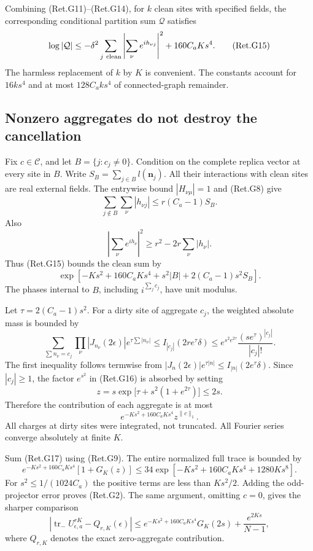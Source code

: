 Combining (Ret.G11)--(Ret.G14), for \(k\) clean sites with specified fields,
the corresponding conditional partition sum \(\mathcal Q\) satisfies
\[
 \log|\mathcal Q|
 \le-\delta^2\sum_{j\ {\rm clean}}
               \left|\sum_\nu e^{ih_{\nu j}}\right|^2
                              +160C_aKs^4.                 \tag{Ret.G15}
\]
The harmless replacement of \(k\) by \(K\) is convenient.
The constants account for \(16ks^4\) and at most
\(128C_aks^4\) of connected-graph remainder.

\hypertarget{nonzero-aggregates-do-not-destroy-the-cancellation}{%
\subsection{Nonzero aggregates do not destroy the cancellation}\label{nonzero-aggregates-do-not-destroy-the-cancellation}}

Fix \(c\in\mathcal C\), and let \(B=\{j:c_j\ne0\}\).
Condition on the complete replica vector at every site in \(B\).
Write \(S_B=\sum_{j\in B}l(\boldsymbol n_j)\).
All their interactions with clean sites are real external fields.
The entrywise bound \(|H_{\nu\mu}|=1\) and (Ret.G8) give
\[
 \sum_{j\notin B}\sum_\nu|h_{\nu j}|
                           \le r(C_a-1)S_B.
\]
Also
\[
 \left|\sum_\nu e^{ih_\nu}\right|^2
                 \ge r^2-2r\sum_\nu|h_\nu|.
\]
Thus (Ret.G15) bounds the clean sum by
\[
 \exp\left[-Ks^2+160C_aKs^4+s^2|B|
                                  +2(C_a-1)s^2S_B\right]. \tag{Ret.G16}
\]
The phases internal to \(B\), including \(i^{\sum_jc_j}\), have unit modulus.

Let \(\tau=2(C_a-1)s^2\). For a dirty site of aggregate \(c_j\),
the weighted absolute mass is bounded by
\[
 \sum_{\sum n_\nu=c_j}\prod_\nu|J_{n_\nu}(2\epsilon)|
                                e^{\tau\sum|n_\nu|}
 \le I_{|c_j|}(2re^\tau\delta)
 \le e^{s^2e^{2\tau}}\frac{(se^\tau)^{|c_j|}}{|c_j|!}.
\]
The first inequality follows termwise from
\(|J_n(2\epsilon)|e^{\tau|n|}\le I_{|n|}(2e^\tau\delta)\).
Since \(|c_j|\ge1\), the factor \(e^{s^2}\) in (Ret.G16) is absorbed by setting
\[
 z=s\exp\big[\tau+s^2(1+e^{2\tau})\big]\le2s.
\]
Therefore the contribution of each aggregate is at most
\[
 e^{-Ks^2+160C_aKs^4}z^{\|c\|_1}.                          \tag{Ret.G17}
\]
All charges at dirty sites were integrated, not truncated.
All Fourier series converge absolutely at finite \(K\).

Sum (Ret.G17) using (Ret.G9). The entire normalized full trace is bounded by
\[
 e^{-Ks^2+160C_aKs^4}[1+G_K(z)]
 \le34\exp[-Ks^2+160C_aKs^4+1280Ks^8].
\]
For \(s^2\le1/(1024C_a)\) the positive terms are less than \(Ks^2/2\).
Adding the odd-projector error proves (Ret.G2).
The same argument, omitting \(c=0\), gives the sharper comparison
\[
 |\operatorname{tr}_-U_{\epsilon,a}^{rK}-Q_{r,K}(\epsilon)|
 \le e^{-Ks^2+160C_aKs^4}G_K(2s)
                                  +\frac{e^{2Ks}}{N-1},    \tag{Ret.G18}
\]
where \(Q_{r,K}\) denotes the exact zero-aggregate contribution.

